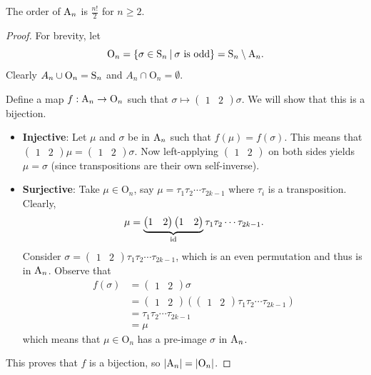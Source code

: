 \newpage

\begin{proposition}\label{prop-order-of-An}
    The order of $\mathrm{A}_{n}$ is $\frac{n!}{2}$ for $n \geq 2$.
\end{proposition}
\begin{proof}
    For brevity, let
    \[
        \mathrm{O}_n = \left\{\sigma \in \Sn{n} \vert \sigma \text{ is odd}\right\} = \Sn{n} \setminus \An{n}.
    \]
    Clearly $A_n \cup \mathrm{O}_n = \mathrm{S}_{n}$ and $A_n \cap \mathrm{O}_n = \emptyset$.

    Define a map $f: \mathrm{A}_{n} \to \mathrm{O}_n$ such that $\sigma \mapsto \begin{pmatrix}1 & 2\end{pmatrix}\sigma$. We will show that this is a bijection.
    \begin{itemize}
        \item \textbf{Injective}: Let $\mu$ and $\sigma$ be in $\mathrm{A}_{n}$ such that $f(\mu) = f(\sigma)$. This means that $\begin{pmatrix}1 & 2\end{pmatrix}\mu = \begin{pmatrix}1 & 2\end{pmatrix}\sigma$. Now left-applying $\begin{pmatrix}1 & 2\end{pmatrix}$ on both sides yields $\mu = \sigma$ (since transpositions are their own self-inverse).
        
        \item \textbf{Surjective}: Take $\mu \in \mathrm{O}_n$, say $\mu = \tau_1\tau_2\cdots\tau_{2k-1}$ where $\tau_i$ is a transposition. Clearly,
        \[
            \mu = \underbrace{\begin{pmatrix}1 & 2\end{pmatrix}\begin{pmatrix}1 & 2\end{pmatrix}}_{\mathrm{id}}\tau_1\tau_2\cdots\tau_{2k-1}.
        \]
        Consider $\sigma = \begin{pmatrix}1 & 2\end{pmatrix}\tau_1\tau_2\cdots\tau_{2k-1}$, which is an even permutation and thus is in $\mathrm{A}_{n}$. Observe that
        \begin{align*}
            f(\sigma) &= \begin{pmatrix}1 & 2\end{pmatrix}\sigma\\
            &= \begin{pmatrix}1 & 2\end{pmatrix}\left(\begin{pmatrix}1 & 2\end{pmatrix}\tau_1\tau_2\cdots\tau_{2k-1}\right)\\
            &= \tau_1\tau_2\cdots\tau_{2k-1}\\
            &= \mu
        \end{align*}
        which means that $\mu \in \mathrm{O}_n$ has a pre-image $\sigma$ in $\mathrm{A}_{n}$.
    \end{itemize}
    This proves that $f$ is a bijection, so $|\mathrm{A}_{n}| = |\mathrm{O}_n|$.
    

\end{proof}
